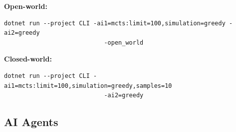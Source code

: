 \textbf{Open-world: }
\begin{lstlisting}[frame=single]
dotnet run --project CLI -ai1=mcts:limit=100,simulation=greedy -ai2=greedy 
							-open_world
\end{lstlisting}

\textbf{Closed-world: }
\begin{lstlisting}[frame=single]
dotnet run --project CLI -ai1=mcts:limit=100,simulation=greedy,samples=10 
							-ai2=greedy
\end{lstlisting}



\subsection{AI Agents}

